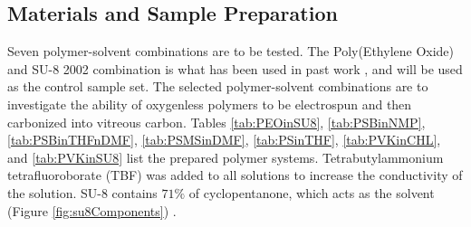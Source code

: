 
\subsection{Materials and Sample Preparation}

Seven polymer-solvent combinations are to be tested. The Poly(Ethylene Oxide) and SU-8 2002 combination is what has been used in past work \cite{Cardenas2017, Flores2017}, and will be used as the control sample set. The selected polymer-solvent combinations are to investigate the ability of oxygenless polymers to be electrospun and then carbonized into vitreous carbon. Tables \ref{tab:PEOinSU8}, \ref{tab:PSBinNMP}, \ref{tab:PSBinTHFnDMF}, \ref{tab:PSMSinDMF}, \ref{tab:PSinTHF}, \ref{tab:PVKinCHL}, and \ref{tab:PVKinSU8} list the prepared polymer systems. Tetrabutylammonium tetrafluoroborate (TBF) was added to all solutions to increase the conductivity of the solution. SU-8 contains $71\%$ of cyclopentanone, which acts as the solvent (Figure \ref{fig:su8Components}) \cite{Microchem2012}.

